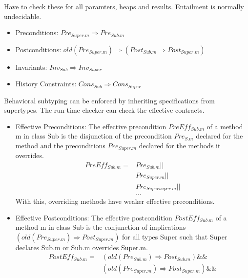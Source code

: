 \begin{mytitle} Have to check these for all paramters, heaps and results. Entailment is normally undecidable.
\begin{itemize}
    \item Preconditions: $Pre_{Super.m} \Rightarrow Pre_{Sub.m}$
    \item Postconditions: $old(Pre_{Super.m}) \Rightarrow (Post_{Sub.m} \Rightarrow Post_{Super.m})$
    \item Invariants: $Inv_{Sub} \Rightarrow Inv_{Super}$
    \item History Constraints: $Cons_{Sub} \Rightarrow Cons_{Super}$
\end{itemize}
\end{mytitle}
\begin{mytitle} Behavioral subtyping can be enforced by inheriting specifications from supertypes. The run-time checker can check the effective contracts.
\begin{itemize}
    \item Effective Preconditions: The effective precondition $PreEff_{Sub.m}$ of a method m in class Sub is the disjunction of the precondition $Pre_{S.m}$ declared for the method and the preconditions $Pre_{Super.m}$ declared for the methods it overrides. 
    \begin{equation*}
        \begin{split}
            PreEff_{Sub.m} = & Pre_{Sub.m} || \\
            & Pre_{Super.m} || \\
            & Pre_{Supersuper.m} || \\
            & \hdots
        \end{split}
    \end{equation*}
    With this, overriding methods have weaker effective preconditions.
    \item Effective Postconditions: The effective postcondition $PostEff_{Sub.m}$ of a method m in class Sub is the conjunction of implications $(old(Pre_{Super.m}) \Rightarrow Post_{Super.m})$ for all types Super such that Super declares Sub.m or Sub.m overrides Super.m. 
    \begin{equation*}
        \begin{split}
        PostEff_{Sub.m} = & (old(Pre_{Sub.m}) \Rightarrow Post_{Sub.m}) \&\& \\
        & (old(Pre_{Super.m}) \Rightarrow Post_{Super.m}) \&\& \\

\end{split}
\end{equation*}
\end{itemize}
\end{mytitle}
